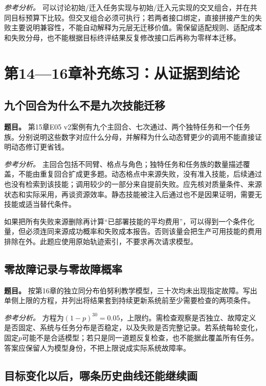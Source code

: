 \emph{参考分析。} 可以讨论初始/迁入任务实现与初始/迁入元实现的交叉组合，并在共同目标预算下比较。但交叉组合必须可执行；若两者接口绑定，直接拼接产生的失败主要说明兼容性，不能自动解释为元层无迁移价值。需保留适配规则、适配成本和失败分母，也不能根据目标终评结果反复修改接口后再称为零样本迁移。

\section{第14—16章补充练习：从证据到结论}

\subsection{九个回合为什么不是九次技能迁移}

\textbf{题目。} 第15章E05 v2案例有九个主回合、七次通过、两个独特任务和一个任务族。分别说明这些数字对应什么分母，并解释为什么动态臂更少的调用不能直接证明动态修订更省钱。

\emph{参考分析。} 主回合包括不同臂、格点与角色；独特任务和任务族的数量描述覆盖，不能由重复回合扩成更多题。动态格点中来源失败，没有准入技能，后续通过也没有检索到该技能；调用较少的一部分来自提前失败。应先核对质量条件、来源状态和实际采用，再谈资源效率。静态技能被注入后通过也不是因果证明，需要无技能或适当替代条件。

如果把所有失败来源删除再计算“已部署技能的平均费用”，可以得到一个条件化量，但必须连同来源成功概率和失败成本报告。否则该量会把生产可用技能的费用排除在外。此题应使用原始轨迹索引，不要求再次请求模型。

\subsection{零故障记录与零故障概率}

\textbf{题目。} 按第16章的独立同分布伯努利教学模型，三十次均未出现指定故障。写出单侧上限的方程，并列出将结果套到持续更新系统前至少需要检查的两项条件。

\emph{参考分析。} 方程为$(1-p)^{30}=0.05$，上限约。需检查观察是否独立、故障定义是否固定、系统与任务分布是否稳定，以及失败是否完整记录。若系统每轮变化，固定$p$可能不是合适模型；若只是同一道题反复检查，也不能据此覆盖所有任务。答案应保留人为模型身份，不把上限说成实际系统故障率。

\subsection{目标变化以后，哪条历史曲线还能继续画}

